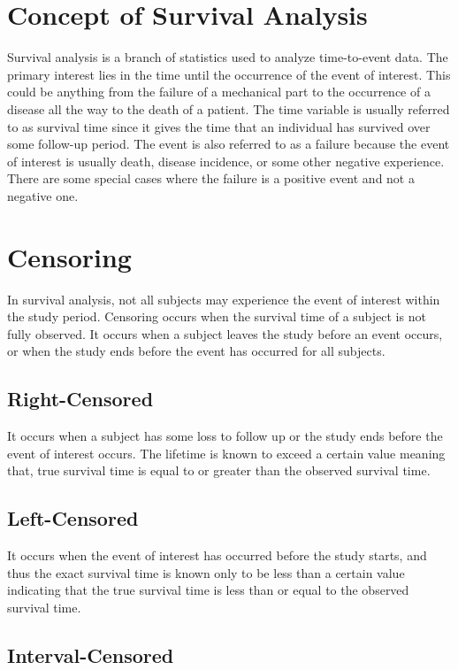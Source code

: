 \documentclass[12pt]{report}
\begin{document}
\section{Concept of Survival Analysis}

Survival analysis is a branch of statistics used to analyze time-to-event data. The primary interest lies in the time until the occurrence of the event of interest. This could be anything from the failure of a mechanical part to the occurrence of a disease all the way to the death of a patient. The time variable is usually referred to as survival time since it gives the time that an individual has survived over some follow-up period. The event is also referred to as a failure because the event of interest is usually death, disease incidence, or some other negative experience. There are some special cases where the failure is a positive event and not a negative one.

\section{Censoring}

In survival analysis, not all subjects may experience the event of interest within the study period. Censoring occurs when the survival time of a subject is not fully observed. It occurs when a subject leaves the study before an event occurs, or when the study ends before the event has occurred for all subjects.


\subsection{Right-Censored}

It occurs when a subject has some loss to follow up or the study ends before the event of interest occurs. The lifetime is known to exceed a certain value meaning that, true survival time is equal to or greater than the observed survival time.

\subsection{Left-Censored}

It occurs when the event of interest has occurred before the study starts, and thus the exact survival time is known only to be less than a certain value indicating that the true survival time is less than or equal to the observed survival time.

\subsection{Interval-Censored}
\end{document}
